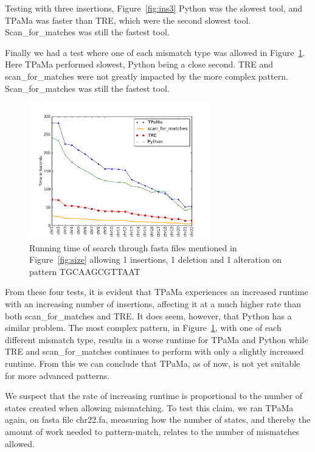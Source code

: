 Testing with three insertions, Figure~\ref{fig:ins3} Python was the slowest tool, and TPaMa was faster than TRE, which were the second slowest tool. Scan\_for\_matches was still the fastest tool.

Finally we had a test where one of each mismatch type was allowed in Figure~\ref{fig:i1m1d1}. Here TPaMa performed slowest, Python being a close second. TRE and scan\_for\_matches were not greatly impacted by the more complex pattern. Scan\_for\_matches was still the fastest tool. 

\begin{figure}[h!]
\centering
\includegraphics[width=0.7\textwidth]{Benchmarking/1ins1mut1del.png}
\caption{Running time of search through fasta files mentioned in Figure~\ref{fig:size} allowing 1 insertions, 1 deletion and 1 alteration on pattern TGCAAGCGTTAAT}
\label{fig:i1m1d1}
\end{figure}

From these four tests, it is evident that TPaMa experiences an increased runtime with an increasing number of insertions, affecting it at a much higher rate than both scan\_for\_matches and TRE.  It does seem, however, that Python has a similar problem.
The most complex pattern, in Figure~\ref{fig:i1m1d1}, with one of each different mismatch type, results in a worse runtime for TPaMa and Python while TRE and scan\_for\_matches continues to perform with only a slightly increased runtime. From this we can conclude that TPaMa, as of now, is not yet suitable for more advanced patterns.

We suspect that the rate of increasing runtime is proportional to the number of states created when allowing mismatching. To test this claim, we ran TPaMa again, on fasta file chr22.fa, measuring how the number of states, and thereby the amount of work needed to pattern-match, relates to the number of mismatches allowed.

